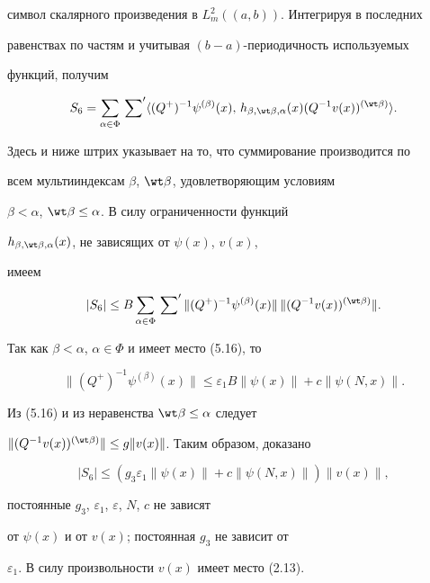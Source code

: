 символ скалярного произведения в $L^2_m((a,b))$. Интегрируя в последних 


равенствах по частям и учитывая $(b{-}a)$-периодичность используемых 


функций, получим 


$$ 


S_6=\sum_{\alpha\in\Phi}


\sideset{}{'}\sum\la(Q^+)^{-1}\psi^{(\beta)}(x), 


\,h_{\beta,\wt\beta,\alpha}(x)(Q^{-1}v(x))^{(\wt\beta)}\ra. 


$$ 


Здесь и ниже штрих указывает на то, что суммирование производится по 


всем мультииндексам $\beta$, $\wt\beta$, удовлетворяющим условиям 


$\beta<\alpha$, $\wt\beta\le\alpha$. В силу ограниченности функций 


$h_{\beta,\wt\beta,\alpha}(x)$, не зависящих от $\psi(x)$, $v(x)$, 


имеем 


$$ 


|S_6|\le B\sum_{\alpha\in\Phi}\sideset{}{'}\sum\|(Q^+)^{-1} 


\psi^{(\beta)}(x)\|\,\|(Q^{-1}v(x))^{(\wt\beta)}\|. 


$$ 


Так как $\beta<\alpha$, $\alpha\in\Phi$ и имеет место (5.16), то 


\begin{equation} 


\|(Q^+)^{-1}\psi^{(\beta)}(x)\|\le\varepsilon_1B\|\psi(x)\|+ 


c\|\psi(N,x)\|. 


\end{equation} 


Из (5.16) и из неравенства $\wt\beta\le\alpha$ следует 


$\|(Q^{-1}v(x))^{(\wt\beta)}\|\le g\|v(x)\|$. Таким образом, доказано 


$$ 


|S_6|\le(g_3\varepsilon_1\|\psi(x)\|+ 


c\|\psi(N,x)\|)\|v(x)\|, 


$$ 


постоянные $g_3$, $\varepsilon_1$, $\varepsilon$, $N$, $c$ не зависят 


от $\psi(x)$ и от $v(x)$; постоянная $g_3$ не зависит от 


$\varepsilon_1$. В силу произвольности $v(x)$ имеет место (2.13). 


